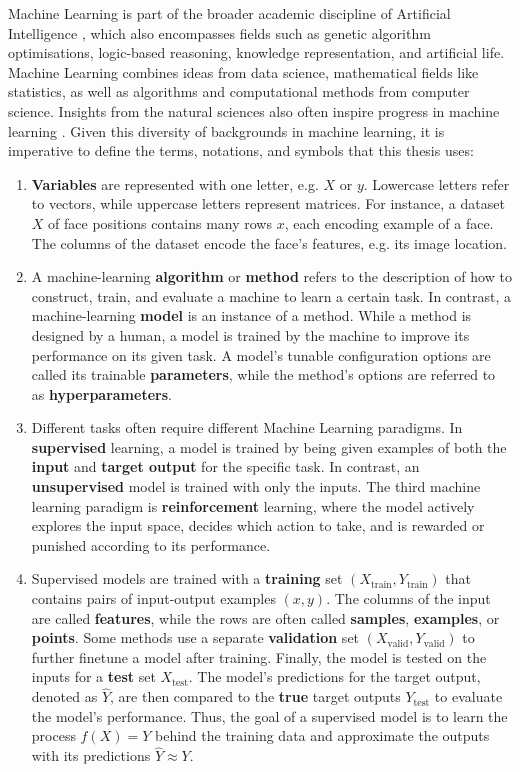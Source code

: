 \newpar Machine Learning is part of the broader academic discipline of Artificial Intelligence \cite{ai-review-2008}, which also encompasses fields such as genetic algorithm optimisations, logic-based reasoning, knowledge representation, and artificial life. Machine Learning combines ideas from data science, mathematical fields like statistics, as well as algorithms and computational methods from computer science. Insights from the natural sciences also often inspire progress in machine learning \cite{biological-dnn-2021}. Given this diversity of backgrounds in machine learning, it is imperative to define the terms, notations, and symbols that this thesis uses:
\begin{enumerate}
    \item \textbf{Variables} are represented with one letter, e.g. $X$ or $y$. Lowercase letters refer to vectors, while uppercase letters represent matrices. For instance, a dataset $X$ of face positions contains many rows $x$, each encoding example of a face. The columns of the dataset encode the face's features, e.g. its image location.
    \item A machine-learning \textbf{algorithm} or \textbf{method} refers to the description of how to construct, train, and evaluate a machine to learn a certain task. In contrast, a machine-learning \textbf{model} is an instance of a method. While a method is designed by a human, a model is trained by the machine to improve its performance on its given task. A model's tunable configuration options are called its trainable \textbf{parameters}, while the method's options are referred to as \textbf{hyperparameters}.
    \item Different tasks often require different Machine Learning paradigms. In \textbf{supervised} learning, a model is trained by being given examples of both the \textbf{input} and \textbf{target output} for the specific task. In contrast, an \textbf{unsupervised} model is trained with only the inputs. The third machine learning paradigm is \textbf{reinforcement} learning, where the model actively explores the input space, decides which action to take, and is rewarded or punished according to its performance.
    \item Supervised models are trained with a \textbf{training} set $(X_{\text{train}}, Y_{\text{train}})$ that contains pairs of input-output examples $(x, y)$. The columns of the input are called \textbf{features}, while the rows are often called \textbf{samples}, \textbf{examples}, or \textbf{points}. Some methods use a separate \textbf{validation} set $(X_{\text{valid}}, Y_{\text{valid}})$ to further finetune a model after training. Finally, the model is tested on the inputs for a \textbf{test} set $X_{\text{test}}$. The model's predictions for the target output, denoted as $\hat{Y}$, are then compared to the \textbf{true} target outputs $Y_{\text{test}}$ to evaluate the model's performance. Thus, the goal of a supervised model is to learn the process $f(X) = Y$ behind the training data and approximate the outputs with its predictions $\hat{Y} \approx Y$.

\end{enumerate}
